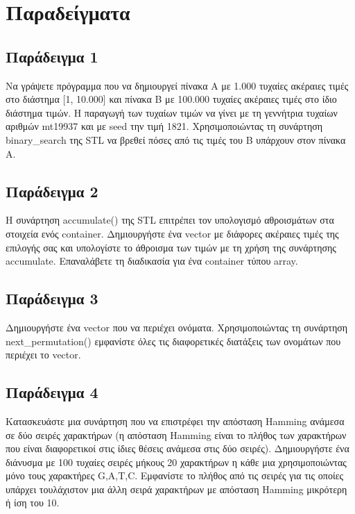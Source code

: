 


\section{Παραδείγματα}
\subsection{Παράδειγμα 1}
Να γράψετε πρόγραμμα που να δημιουργεί πίνακα Α με 1.000 τυχαίες ακέραιες τιμές στο διάστημα [1, 10.000] και πίνακα Β με 100.000 τυχαίες ακέραιες τιμές στο ίδιο διάστημα τιμών. Η παραγωγή των τυχαίων τιμών να γίνει με τη γεννήτρια τυχαίων αριθμών mt19937 και με seed την τιμή 1821. Χρησιμοποιώντας τη συνάρτηση binary\_search της STL να βρεθεί πόσες από τις τιμές του Β υπάρχουν στον πίνακα Α.






\subsection{Παράδειγμα 2}
Η συνάρτηση accumulate() της STL επιτρέπει τον υπολογισμό αθροισμάτων στα στοιχεία ενός container. Δημιουργήστε ένα vector με διάφορες ακέραιες τιμές της επιλογής σας και υπολογίστε το άθροισμα των τιμών με τη χρήση της συνάρτησης accumulate. Επαναλάβετε τη διαδικασία για ένα container τύπου array.





\subsection{Παράδειγμα 3}
Δημιουργήστε ένα vector που να περιέχει ονόματα. Χρησιμοποιώντας τη συνάρτηση next\_permutation() εμφανίστε όλες τις διαφορετικές διατάξεις των ονομάτων που περιέχει το vector.





\subsection{Παράδειγμα 4}
Κατασκευάστε μια συνάρτηση που να επιστρέφει την απόσταση Hamming ανάμεσα σε δύο σειρές χαρακτήρων (η απόσταση Hamming είναι το πλήθος των χαρακτήρων που είναι διαφορετικοί στις ίδιες θέσεις ανάμεσα στις δύο σειρές). Δημιουργήστε ένα διάνυσμα με 100 τυχαίες σειρές μήκους 20 χαρακτήρων η κάθε μια χρησιμοποιώντας μόνο τους χαρακτήρες G,A,T,C. Εμφανίστε το πλήθος από τις σειρές για τις οποίες υπάρχει τουλάχιστον μια άλλη σειρά χαρακτήρων με απόσταση Hamming μικρότερη ή ίση του 10.

